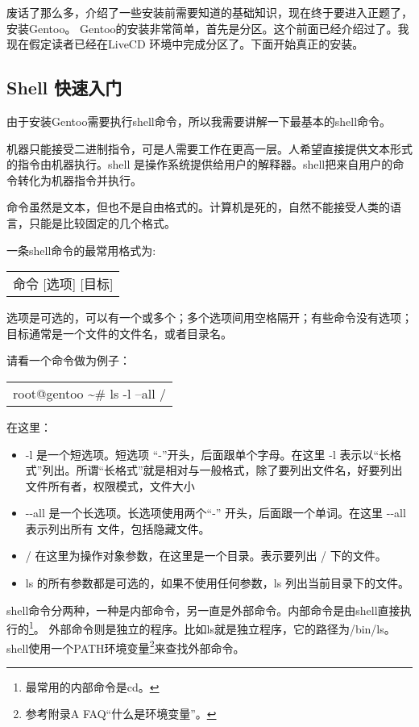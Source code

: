 \documentclass[amstex]{ctexbook}
\newenvironment{code}{\small\tt\begin{longtable}{p{0.8\textwidth}}}{\end{longtable}}
\begin{document}
废话了那么多，介绍了一些安装前需要知道的基础知识，现在终于要进入正题了，安装Gentoo。
Gentoo的安装非常简单，首先是分区。这个前面已经介绍过了。我现在假定读者已经在LiveCD 环境中完成分区了。下面开始真正的安装。


\subsection{Shell 快速入门}

由于安装Gentoo需要执行shell命令，所以我需要讲解一下最基本的shell命令。

机器只能接受二进制指令，可是人需要工作在更高一层。人希望直接提供文本形式的指令由机器执行。shell 是操作系统提供给用户的解释器。shell把来自用户的命令转化为机器指令并执行。

命令虽然是文本，但也不是自由格式的。计算机是死的，自然不能接受人类的语言，只能是比较固定的几个格式。

一条shell命令的最常用格式为:

\begin{code}
命令 [选项] [目标]
\end{code}

选项是可选的，可以有一个或多个；多个选项间用空格隔开；有些命令没有选项；目标通常是一个文件的文件名，或者目录名。

请看一个命令做为例子： 

\begin{code}
root@gentoo \textasciitilde \# ls -l --all /  
\end{code}
在这里：

\begin{itemize}
\item -l 是一个短选项。短选项 “-”开头，后面跟单个字母。在这里 -l 表示以“长格式”列出。所谓“长格式”就是相对与一般格式，除了要列出文件名，好要列出文件所有者，权限模式，文件大小
\item -{}-all 是一个长选项。长选项使用两个“-” 开头，后面跟一个单词。在这里 -{}-all 表示列出所有 文件，包括隐藏文件。
\item / 在这里为操作对象参数，在这里是一个目录。表示要列出 / 下的文件。
\item ls 的所有参数都是可选的，如果不使用任何参数，ls 列出当前目录下的文件。


\end{itemize}

shell命令分两种，一种是内部命令，另一直是外部命令。内部命令是由shell直接执行的\footnote{最常用的内部命令是cd。}。
外部命令则是独立的程序。比如ls就是独立程序，它的路径为/bin/ls。shell使用一个PATH环境变量\footnote{参考附录A FAQ“什么是环境变量”。}来查找外部命令。
\end{document}
